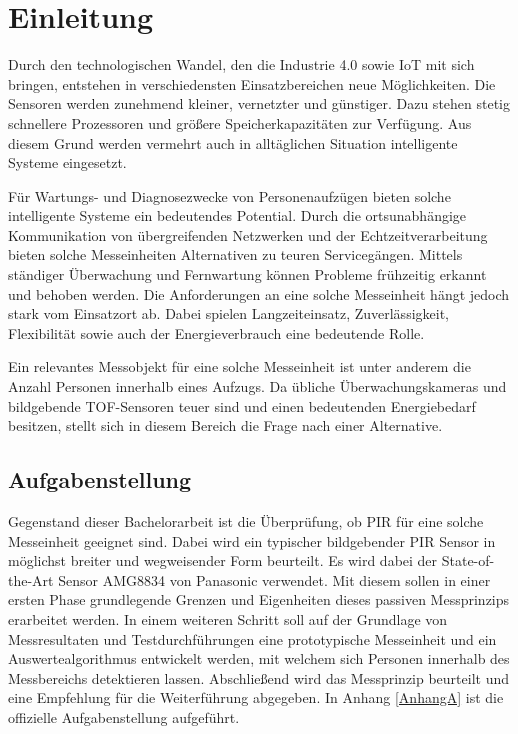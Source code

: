 \chapter{Einleitung}
\label{chap:Einleitung}


\label{sec:Ausgangssituation}
Durch den technologischen Wandel, den die Industrie 4.0 sowie \ac{IoT}  mit sich bringen, entstehen in verschiedensten Einsatzbereichen neue Möglichkeiten. Die Sensoren werden zunehmend kleiner, vernetzter und günstiger. Dazu stehen stetig schnellere Prozessoren und größere Speicherkapazitäten zur Verfügung. Aus diesem Grund werden vermehrt auch in alltäglichen Situation intelligente Systeme eingesetzt. 

Für Wartungs- und Diagnosezwecke von Personenaufzügen bieten solche intelligente Systeme ein bedeutendes Potential. Durch die ortsunabhängige Kommunikation von übergreifenden Netzwerken und der Echtzeitverarbeitung bieten solche Messeinheiten Alternativen zu teuren Servicegängen. Mittels ständiger Überwachung und Fernwartung können Probleme frühzeitig erkannt und behoben werden. Die Anforderungen an eine solche Messeinheit hängt jedoch stark vom Einsatzort ab. Dabei spielen Langzeiteinsatz, Zuverlässigkeit, Flexibilität sowie auch der Energieverbrauch eine bedeutende Rolle.

Ein relevantes Messobjekt für eine solche Messeinheit ist unter anderem die Anzahl Personen innerhalb eines Aufzugs. Da übliche Überwachungskameras und bildgebende TOF-Sensoren teuer sind und einen bedeutenden Energiebedarf besitzen, stellt sich in diesem Bereich die Frage nach einer Alternative.

\section{Aufgabenstellung}
\label{chap:Aufgabenstellung}
Gegenstand dieser Bachelorarbeit ist die Überprüfung, ob \ac{PIR} für eine solche Messeinheit geeignet sind. Dabei wird ein typischer bildgebender \ac{PIR} Sensor in möglichst breiter und wegweisender Form beurteilt. Es wird dabei der State-of-the-Art Sensor AMG8834 von Panasonic verwendet. Mit diesem sollen in einer ersten Phase grundlegende Grenzen und Eigenheiten dieses passiven Messprinzips erarbeitet werden. In einem weiteren Schritt soll auf der Grundlage von Messresultaten und Testdurchführungen eine prototypische Messeinheit und ein Auswertealgorithmus entwickelt werden, mit welchem sich Personen innerhalb des Messbereichs detektieren lassen. Abschließend wird das Messprinzip beurteilt und eine Empfehlung für die Weiterführung abgegeben. In Anhang \ref{AnhangA} ist die offizielle Aufgabenstellung aufgeführt.

